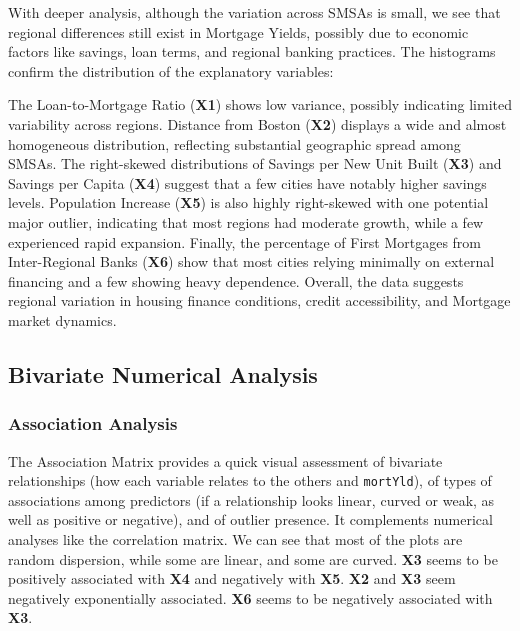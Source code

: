 \documentclass[
  11pt,
]{article}
\begin{document}
With deeper analysis, although the variation across SMSAs is small, we
see that regional differences still exist in Mortgage Yields, possibly
due to economic factors like savings, loan terms, and regional banking
practices. The histograms confirm the distribution of the explanatory
variables:

The Loan-to-Mortgage Ratio (\textbf{X1}) shows low variance, possibly
indicating limited variability across regions. Distance from Boston
(\textbf{X2}) displays a wide and almost homogeneous distribution,
reflecting substantial geographic spread among SMSAs. The right-skewed
distributions of Savings per New Unit Built (\textbf{X3}) and Savings
per Capita (\textbf{X4}) suggest that a few cities have notably higher
savings levels. Population Increase (\textbf{X5}) is also highly
right-skewed with one potential major outlier, indicating that most
regions had moderate growth, while a few experienced rapid expansion.
Finally, the percentage of First Mortgages from Inter-Regional Banks
(\textbf{X6}) show that most cities relying minimally on external
financing and a few showing heavy dependence. Overall, the data suggests
regional variation in housing finance conditions, credit accessibility,
and Mortgage market dynamics.

\subsection{Bivariate Numerical
Analysis}\label{bivariate-numerical-analysis}

\subsubsection{Association Analysis}\label{association-analysis}

The Association Matrix provides a quick visual assessment of bivariate
relationships (how each variable relates to the others and
\texttt{mortYld}), of types of associations among predictors (if a
relationship looks linear, curved or weak, as well as positive or
negative), and of outlier presence. It complements numerical analyses
like the correlation matrix. We can see that most of the plots are
random dispersion, while some are linear, and some are curved.
\textbf{X3} seems to be positively associated with \textbf{X4} and
negatively with \textbf{X5}. \textbf{X2} and \textbf{X3} seem negatively
exponentially associated. \textbf{X6} seems to be negatively associated
with \textbf{X3}.
\end{document}
